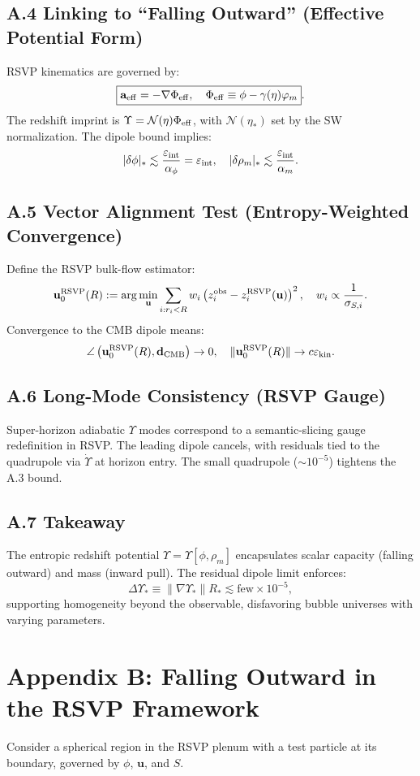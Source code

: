\subsection*{A.4 Linking to ``Falling Outward'' (Effective Potential Form)}
RSVP kinematics are governed by:
\[
\boxed{\mathbf{a}_{\rm eff} = -\nabla \Phi_{\rm eff}, \quad \Phi_{\rm eff} \equiv \phi - \gamma(\eta) \varphi_m}.
\]
The redshift imprint is \(\Upsilon = \mathcal{N}(\eta) \Phi_{\rm eff}\), with \(\mathcal{N}(\eta_*)\) set by the SW normalization. The dipole bound implies:
\[
|\delta\phi|_* \lesssim \frac{\varepsilon_{\rm int}}{\alpha_\phi} = \varepsilon_{\rm int}, \quad |\delta\rho_m|_* \lesssim \frac{\varepsilon_{\rm int}}{\alpha_m}.
\]

\subsection*{A.5 Vector Alignment Test (Entropy-Weighted Convergence)}
Define the RSVP bulk-flow estimator:
\[
\mathbf{u}_0^{\rm RSVP}(R) := \arg\min_{\mathbf{u}} \sum_{i: r_i<R} w_i \left( z_i^{\rm obs} - z_i^{\rm RSVP}(\mathbf{u}) \right)^2, \quad w_i \propto \frac{1}{\sigma_{S,i}}.
\]
Convergence to the CMB dipole means:
\[
\angle\left(\mathbf{u}_0^{\rm RSVP}(R), \mathbf{d}_{\rm CMB}\right) \to 0, \quad \|\mathbf{u}_0^{\rm RSVP}(R)\| \to c \varepsilon_{\rm kin}.
\]

\subsection*{A.6 Long-Mode Consistency (RSVP Gauge)}
Super-horizon adiabatic \(\Upsilon\) modes correspond to a semantic-slicing gauge redefinition in RSVP. The leading dipole cancels, with residuals tied to the quadrupole via \(\dot{\Upsilon}\) at horizon entry. The small quadrupole (\(\sim 10^{-5}\)) tightens the A.3 bound.

\subsection*{A.7 Takeaway}
The entropic redshift potential \(\Upsilon = \Upsilon[\phi, \rho_m]\) encapsulates scalar capacity (falling outward) and mass (inward pull). The residual dipole limit enforces:
\[
\Delta \Upsilon_* \equiv \|\nabla \Upsilon_*\| R_* \lesssim \text{few} \times 10^{-5},
\]
supporting homogeneity beyond the observable, disfavoring bubble universes with varying parameters.

\section*{Appendix B: Falling Outward in the RSVP Framework}
Consider a spherical region in the RSVP plenum with a test particle at its boundary, governed by \(\phi\), \(\mathbf{u}\), and \(S\).

